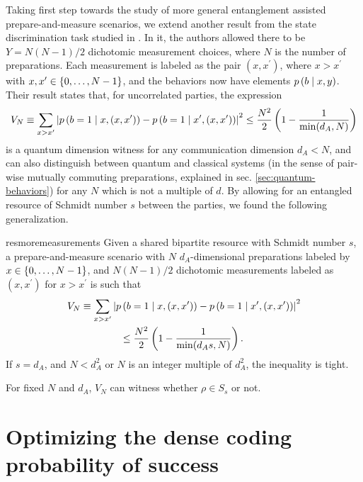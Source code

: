         Taking first step towards the study of more general entanglement assisted prepare-and-measure scenarios, we extend another result from the state discrimination task studied in \cite{brunner_dimension_2013}. In it, the authors allowed there to be $Y = N (N-1)/2$ dichotomic measurement choices, where $N$ is the number of preparations. Each measurement is labeled as the pair $(x, x^\prime)$, where $x > x^\prime$ with $x, x^\prime \in \{ 0, \ldots, N-1 \}$, and the behaviors now have elements $p \left( b \mid x,y \right)$. Their result states that, for uncorrelated parties, the expression
        $$
            V_N \equiv \sum_{x > x^\prime} \abs{ p \left( b=1 \mid x, (x, x^\prime) \right) - p \left( b=1 \mid x^\prime, (x, x^\prime) \right) }^2 \leq \frac{N^2}{2} \left( 1 - \frac{1}{\min(d_A,N)} \right)
        $$
        is a quantum dimension witness for any communication dimension $d_A < N$, and can also distinguish between quantum and classical systems (in the sense of pair-wise mutually commuting preparations, explained in sec. \ref{sec:quantum-behaviors}) for any $N$ which is not a multiple of $d$. By allowing for an entangled resource of Schmidt number $s$ between the parties, we found the following generalization.
        
        \begin{restatable}{res}{moremeasurements}
            Given a shared bipartite resource with Schmidt number $s$, a prepare-and-measure scenario with $N$ $d_A$-dimensional preparations labeled by $x \in \{ 0, \ldots, N-1 \}$, and $N (N-1)/2$ dichotomic measurements labeled as $(x, x^\prime)$ for $x > x^\prime$ is such that
            \begin{align*}
                V_N &\equiv \sum_{x > x^\prime} \abs{ p \left( b=1 \mid x, (x, x^\prime) \right) - p \left( b=1 \mid x^\prime, (x, x^\prime) \right) }^2 \\
                &\qquad\qquad\leq \frac{N^2}{2} \left( 1 - \frac{1}{\min(d_A s,N)} \right) .
            \end{align*}
            If $s = d_A$, and $N < d_A^2$ or $N$ is an integer multiple of $d_A^2$, the inequality is tight.
            \label{res:more-measurements}
        \end{restatable}
        
        For fixed $N$ and $d_A$, $V_N$ can witness whether $\rho \in S_s$ or not.
    

    \section{Optimizing the dense coding probability of success}
    \label{sec:pam-quantum-optimization}

